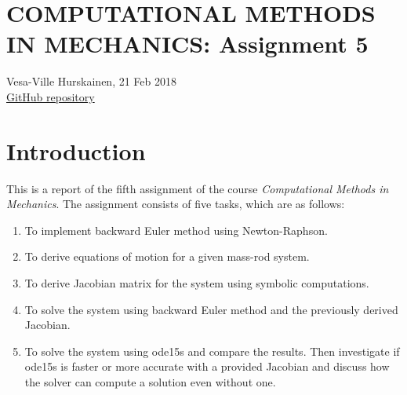 \documentclass{article}
\begin{document}
	\section*{COMPUTATIONAL METHODS IN MECHANICS: Assignment 5}
	Vesa-Ville Hurskainen, 21 Feb 2018\\
	\href{https://github.com/VesaVilleHurskainen/cmim2018}{GitHub repository}

	\section*{Introduction}
	This is a report of the fifth assignment of the course \textit{Computational Methods in Mechanics}. The assignment consists of five tasks, which are as follows:
	\begin{enumerate}
		\setlength\itemsep{0pt}
		\item To implement backward Euler method using Newton-Raphson.
		\item To derive equations of motion for a given mass-rod system.
		\item To derive Jacobian matrix for the system using symbolic computations.
		\item To solve the system using backward Euler method and the previously derived Jacobian.
		\item To solve the system using ode15s and compare the results. Then investigate if ode15s is faster or more accurate with a provided Jacobian and discuss how the solver can compute a solution even without one.
	\end{enumerate}
\end{document}
